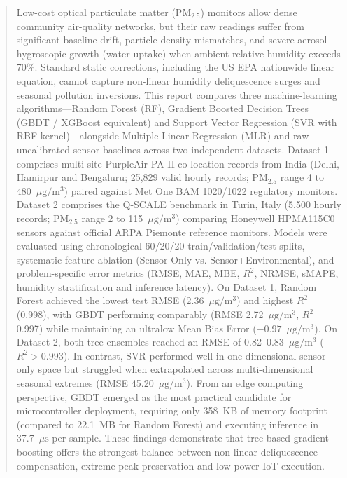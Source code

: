 \documentclass[11pt,a4paper]{article}
\begin{document}
\begin{abstract}
Low-cost optical particulate matter ($\text{PM}_{2.5}$) monitors allow dense community air-quality networks, but their raw readings suffer from significant baseline drift, particle density mismatches, and severe aerosol hygroscopic growth (water uptake) when ambient relative humidity exceeds 70\%. Standard static corrections, including the US EPA nationwide linear equation, cannot capture non-linear humidity deliquescence surges and seasonal pollution inversions. This report compares three machine-learning algorithms---Random Forest (RF), Gradient Boosted Decision Trees (GBDT / XGBoost equivalent) and Support Vector Regression (SVR with RBF kernel)---alongside Multiple Linear Regression (MLR) and raw uncalibrated sensor baselines across two independent datasets. Dataset 1 comprises multi-site PurpleAir PA-II co-location records from India (Delhi, Hamirpur and Bengaluru; 25,829 valid hourly records; $\text{PM}_{2.5}$ range 4 to 480~$\mu\text{g}/\text{m}^3$) paired against Met One BAM 1020/1022 regulatory monitors. Dataset 2 comprises the Q-SCALE benchmark in Turin, Italy (5,500 hourly records; $\text{PM}_{2.5}$ range 2 to 115~$\mu\text{g}/\text{m}^3$) comparing Honeywell HPMA115C0 sensors against official ARPA Piemonte reference monitors. Models were evaluated using chronological 60/20/20 train/validation/test splits, systematic feature ablation (Sensor-Only vs. Sensor+Environmental), and problem-specific error metrics (RMSE, MAE, MBE, $R^2$, NRMSE, sMAPE, humidity stratification and inference latency). On Dataset 1, Random Forest achieved the lowest test RMSE (2.36~$\mu\text{g}/\text{m}^3$) and highest $R^2$ (0.998), with GBDT performing comparably (RMSE 2.72~$\mu\text{g}/\text{m}^3$, $R^2$ 0.997) while maintaining an ultralow Mean Bias Error ($-0.97$~$\mu\text{g}/\text{m}^3$). On Dataset 2, both tree ensembles reached an RMSE of 0.82--0.83~$\mu\text{g}/\text{m}^3$ ($R^2 > 0.993$). In contrast, SVR performed well in one-dimensional sensor-only space but struggled when extrapolated across multi-dimensional seasonal extremes (RMSE 45.20~$\mu\text{g}/\text{m}^3$). From an edge computing perspective, GBDT emerged as the most practical candidate for microcontroller deployment, requiring only 358~KB of memory footprint (compared to 22.1~MB for Random Forest) and executing inference in 37.7~$\mu\text{s}$ per sample. These findings demonstrate that tree-based gradient boosting offers the strongest balance between non-linear deliquescence compensation, extreme peak preservation and low-power IoT execution.
\end{abstract}
\end{document}

